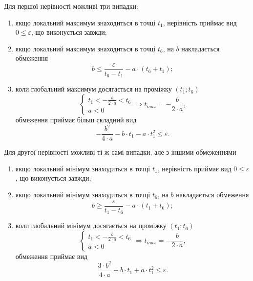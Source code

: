 Для першої нерівності можливі три випадки:
\begin{enumerate}
  \item
    якщо локальний максимум знаходиться в точці $t_1$, нерівність приймає вид
    $0 \le \varepsilon$, що виконується завжди;
  \item
    якщо локальний максимум знаходиться в точці $t_6$, на $b$ накладається
    обмеження
    \begin{equation*}
      b \le \frac{\varepsilon}{t_6 - t_1} - a \cdot \left( t_6 + t_1 \right);
    \end{equation*}
  \item
    коли глобальний максимум досягається на проміжку $\left( t_1; t_6 \right)$
    \begin{equation*}
      \begin{cases}
        t_1 < - \frac{b}{2 \cdot a} < t_6 \\
        a < 0
      \end{cases} \Rightarrow
      t_{max} = - \frac{b}{2 \cdot a},
    \end{equation*}
    обмеження приймає більш складний вид
    \begin{equation*}
      - \frac{b^2}{4 \cdot a} - b \cdot t_1 - a \cdot t_1^2 \le \varepsilon.
    \end{equation*}
\end{enumerate}

Для другої нерівності можливі ті ж самі випадки, але з іншими обмеженнями
\begin{enumerate}
  \item
    якщо локальний мінімум знаходиться в точці $t_1$, нерівність приймає вид
    $0 \le \varepsilon$, що виконується завжди;
  \item
    якщо локальний мінімум знаходиться в точці $t_6$, на $b$ накладається
    обмеження
    \begin{equation*}
      b \ge \frac{\varepsilon}{t_1 - t_6} - a \cdot \left( t_1 + t_6 \right);
    \end{equation*}
  \item
    коли глобальний мінімум досягається на проміжку $\left( t_1; t_6 \right)$
    \begin{equation*}
      \begin{cases}
        t_1 < - \frac{b}{2 \cdot a} < t_6 \\
        a < 0
      \end{cases} \Rightarrow
      t_{max} = - \frac{b}{2 \cdot a},
    \end{equation*}
    обмеження приймає вид
    \begin{equation*}
      \frac{3 \cdot b^2}{4 \cdot a} + b \cdot t_1 + a \cdot t_1^2
      \le \varepsilon.
    \end{equation*}
\end{enumerate}

